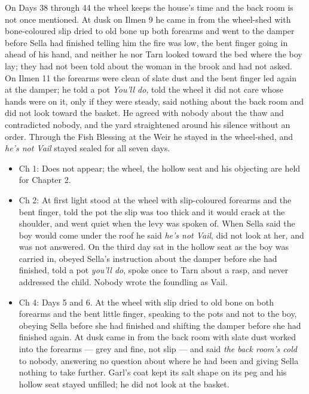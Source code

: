 \documentclass{design/chronicle}
\begin{document}
{On Days 38 through 44 the wheel keeps the house’s time and the back room is not once mentioned. At dusk on Ilmen 9 he came in from the wheel-shed with bone-coloured slip dried to old bone up both forearms and went to the damper before Sella had finished telling him the fire was low, the bent finger going in ahead of his hand, and neither he nor Tarn looked toward the bed where the boy lay; they had not been told about the woman in the brook and had not asked. On Ilmen 11 the forearms were clean of slate dust and the bent finger led again at the damper; he told a pot \emph{You’ll do}, told the wheel it did not care whose hands were on it, only if they were steady, said nothing about the back room and did not look toward the basket. He agreed with nobody about the thaw and contradicted nobody, and the yard straightened around his silence without an order. Through the Fish Blessing at the Weir he stayed in the wheel-shed, and \emph{he’s not Vail} stayed sealed for all seven days.

\begin{itemize}[leftmargin=1.4em,itemsep=1pt,topsep=3pt,parsep=0pt]

\item Ch 1: Does not appear; the wheel, the hollow seat and his objecting are held for Chapter 2.

\item Ch 2: At first light stood at the wheel with slip-coloured forearms and the bent finger, told the pot the slip was too thick and it would crack at the shoulder, and went quiet when the levy was spoken of. When Sella said the boy would come under the roof he said \emph{he’s not Vail}, did not look at her, and was not answered. On the third day sat in the hollow seat as the boy was carried in, obeyed Sella’s instruction about the damper before she had finished, told a pot \emph{you’ll do}, spoke once to Tarn about a rasp, and never addressed the child. Nobody wrote the foundling as Vail.

\end{itemize}

\begin{itemize}[leftmargin=1.4em,itemsep=1pt,topsep=3pt,parsep=0pt]

\item Ch 4: Days 5 and 6. At the wheel with slip dried to old bone on both forearms and the bent little finger, speaking to the pots and not to the boy, obeying Sella before she had finished and shifting the damper before she had finished again. At dusk came in from the back room with slate dust worked into the forearms --- grey and fine, not slip --- and said \emph{the back room’s cold} to nobody, answering no question about where he had been and giving Sella nothing to take further. Garl’s coat kept its salt shape on its peg and his hollow seat stayed unfilled; he did not look at the basket.


\end{itemize}}
\end{document}

